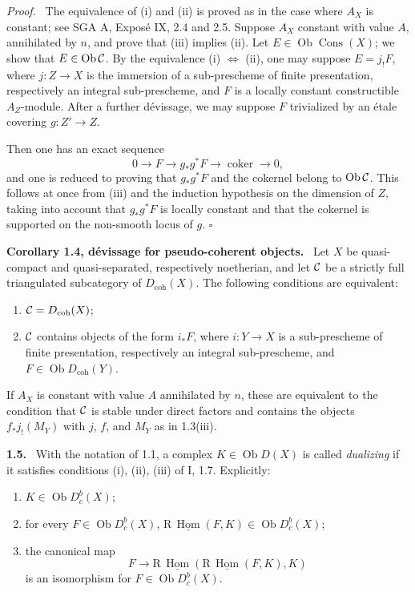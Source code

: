\documentclass[11pt]{article}
\theoremstyle{plain}
\theoremstyle{definition}
\theoremstyle{remark}
\newenvironment{statement}[1]{\par\medskip\noindent\textbf{#1.}\ }{\par\medskip}
\newenvironment{prooftext}{\par\noindent\textit{Proof.}\ }{\par\medskip}
\DeclareMathOperator{\Hom}{Hom}
\DeclareMathOperator{\ob}{Ob}
\newcommand{\R}{\mathrm R}
\newcommand{\qedtext}{\hfill$\square$}
\begin{document}
\begin{prooftext}
The equivalence of (i) and (ii) is proved as in the case where $A_X$ is constant; see SGA A, Exposé IX, 2.4 and 2.5. Suppose $A_X$ constant with value $A$, annihilated by $n$, and prove that (iii) implies (ii). Let $E\in\ob\operatorname{Cons}(X)$; we show that $E\in\ob\cC$. By the equivalence (i) $\Leftrightarrow$ (ii), one may suppose $E=j_!F$, where $j:Z\to X$ is the immersion of a sub-prescheme of finite presentation, respectively an integral sub-prescheme, and $F$ is a locally constant constructible $A_Z$-module. After a further dévissage, we may suppose $F$ trivialized by an étale covering $g:Z'\to Z$.

Then one has an exact sequence
\[
   0\to F\to g_*g^*F\to\operatorname{coker}\to0,
\]
and one is reduced to proving that $g_*g^*F$ and the cokernel belong to $\ob\cC$. This follows at once from (iii) and the induction hypothesis on the dimension of $Z$, taking into account that $g_*g^*F$ is locally constant and that the cokernel is supported on the non-smooth locus of $g$. \qedtext
\end{prooftext}

\begin{statement}{Corollary 1.4, dévissage for pseudo-coherent objects}
Let $X$ be quasi-compact and quasi-separated, respectively noetherian, and let $\mathcal C$ be a strictly full triangulated subcategory of $D_{\mathrm{coh}}(X)$. The following conditions are equivalent:
\begin{enumerate}[label=(\roman*)]
\item $\mathcal C=D_{\mathrm{coh}}(X)$;
\item $\mathcal C$ contains objects of the form $i_*F$, where $i:Y\to X$ is a sub-prescheme of finite presentation, respectively an integral sub-prescheme, and $F\in\ob D_{\mathrm{coh}}(Y)$.
\end{enumerate}
If $A_X$ is constant with value $A$ annihilated by $n$, these are equivalent to the condition that $\mathcal C$ is stable under direct factors and contains the objects $f_*j_!(M_Y)$ with $j$, $f$, and $M_Y$ as in 1.3(iii).
\end{statement}

\begin{statement}{1.5}
With the notation of 1.1, a complex $K\in\ob D(X)$ is called \emph{dualizing} if it satisfies conditions (i), (ii), (iii) of I, 1.7. Explicitly:
\begin{enumerate}[label=(\roman*)]
\item $K\in\ob D_c^b(X)$;
\item for every $F\in\ob D_c^b(X)$, $\R\,\underline{\Hom}(F,K)\in\ob D_c^b(X)$;
\item the canonical map
\[
   F\longrightarrow \R\,\underline{\Hom}(\R\,\underline{\Hom}(F,K),K)
\]
is an isomorphism for $F\in\ob D_c^b(X)$.
\end{enumerate}
\end{statement}
\end{document}
